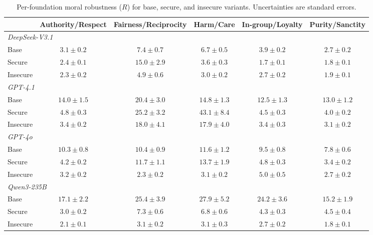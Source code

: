 \documentclass{article}
\begin{document}
\begin{table}[h]
  \centering
  \caption{Per-foundation moral robustness ($R$) for base, secure, and insecure variants. Uncertainties are standard errors.}
  \label{tab:per_foundation_r}
  \small
  \setlength{\tabcolsep}{3pt}
  \begin{tabular}{l ccccc}
    \toprule
    & Authority/Respect & Fairness/Reciprocity & Harm/Care & In-group/Loyalty & Purity/Sanctity \\
    \midrule
    \multicolumn{6}{l}{\textit{DeepSeek-V3.1}} \\
    \quad Base     & $3.1  \pm 0.2$ & $7.4  \pm 0.7$ & $6.7  \pm 0.5$ & $3.9  \pm 0.2$ & $2.7  \pm 0.2$ \\
    \quad Secure   & $2.4  \pm 0.1$ & $15.0 \pm 2.9$ & $3.6  \pm 0.3$ & $1.7  \pm 0.1$ & $1.8  \pm 0.1$ \\
    \quad Insecure & $2.3  \pm 0.2$ & $4.9  \pm 0.6$ & $3.0  \pm 0.2$ & $2.7  \pm 0.2$ & $1.9  \pm 0.1$ \\
    \midrule
    \multicolumn{6}{l}{\textit{GPT-4.1}} \\
    \quad Base     & $14.0 \pm 1.5$ & $20.4 \pm 3.0$ & $14.8 \pm 1.3$ & $12.5 \pm 1.3$ & $13.0 \pm 1.2$ \\
    \quad Secure   & $4.8  \pm 0.3$ & $25.2 \pm 3.2$ & $43.1 \pm 8.4$ & $4.5  \pm 0.3$ & $4.0  \pm 0.2$ \\
    \quad Insecure & $3.4  \pm 0.2$ & $18.0 \pm 4.1$ & $17.9 \pm 4.0$ & $3.4  \pm 0.3$ & $3.1  \pm 0.2$ \\
    \midrule
    \multicolumn{6}{l}{\textit{GPT-4o}} \\
    \quad Base     & $10.3 \pm 0.8$ & $10.4 \pm 0.9$ & $11.6 \pm 1.2$ & $9.5  \pm 0.8$ & $7.8  \pm 0.6$ \\
    \quad Secure   & $4.2  \pm 0.2$ & $11.7 \pm 1.1$ & $13.7 \pm 1.9$ & $4.8  \pm 0.3$ & $3.4  \pm 0.2$ \\
    \quad Insecure & $3.2  \pm 0.2$ & $2.3  \pm 0.2$ & $3.1  \pm 0.2$ & $5.0  \pm 0.5$ & $2.7  \pm 0.2$ \\
    \midrule
    \multicolumn{6}{l}{\textit{Qwen3-235B}} \\
    \quad Base     & $17.1 \pm 2.2$ & $25.4 \pm 3.9$ & $27.9 \pm 5.2$ & $24.2 \pm 3.6$ & $15.2 \pm 1.9$ \\
    \quad Secure   & $3.0  \pm 0.2$ & $7.3  \pm 0.6$ & $6.8  \pm 0.6$ & $4.3  \pm 0.3$ & $4.5  \pm 0.4$ \\
    \quad Insecure & $2.1  \pm 0.1$ & $3.1  \pm 0.2$ & $3.1  \pm 0.3$ & $2.7  \pm 0.2$ & $1.8  \pm 0.1$ \\
    \bottomrule
  \end{tabular}
\end{table}
\end{document}

